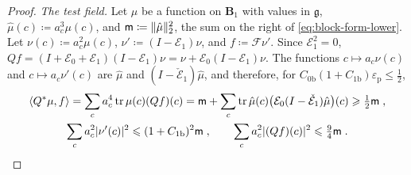 \documentclass[11pt]{preprint}
\DeclarePairedDelimiter{\abs}{\lvert}{\rvert}
\DeclarePairedDelimiter{\norm}{\lVert}{\rVert}
\numberwithin{equation}{section}
\begin{document}
\begin{proof}
\emph{The test field.} Let $\mu$ be a function on $\mathbf B_1$ with values in $\mathfrak g$, $\hat\mu(c) \coloneqq a_c^3\mu(c)$, and $\mathsf m \coloneqq \norm{\hat\mu}_2^2$, the sum on the right of \eqref{eq:block-form-lower}. Let $\nu(c) \coloneqq a_c^2\mu(c)$, $\nu' \coloneqq (I - \mathcal E_1)\nu$, and $f \coloneqq \mathcal F\nu'$. Since $\mathcal E_1^2 = 0$, $Qf = (I + \mathcal E_0 + \mathcal E_1)(I - \mathcal E_1)\nu = \nu + \mathcal E_0(I - \mathcal E_1)\nu$. The functions $c \mapsto a_c\nu(c)$ and $c \mapsto a_c\nu'(c)$ are $\hat\mu$ and $(I - \check{\mathcal E}_1)\hat\mu$, and therefore, for $C_{0\mathrm b}(1 + C_{1\mathrm b})\varepsilon_{\mathrm p} \leqslant \frac{1}{2}$,
\begin{equation}\label{eq:test-field}
\begin{gathered}
    \langle Q^*\mu, f\rangle = \sum_ca_c^4\tr\mu(c)(Qf)(c) = \mathsf m + \sum_c\tr\hat\mu(c)\bigl(\mathcal E_0(I - \check{\mathcal E}_1)\hat\mu\bigr)(c) \geqslant \tfrac{1}{2}\mathsf m\;,\\
    \sum_ca_c^2\abs{\nu'(c)}^2 \leqslant (1 + C_{1\mathrm b})^2\mathsf m\;,
    \qquad
    \sum_ca_c^2\abs{(Qf)(c)}^2 \leqslant \tfrac{9}{4}\mathsf m\;.
\end{gathered}
\end{equation}


\end{proof}
\end{document}
